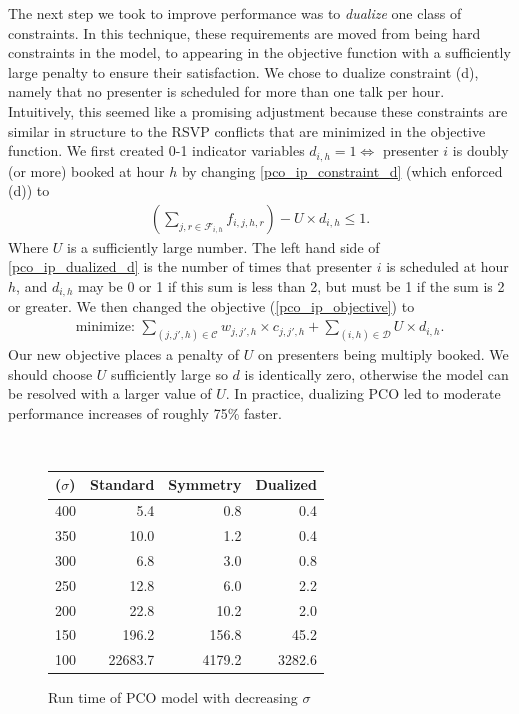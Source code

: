 \documentclass{svjour3}                     %
\begin{document}
The next step we took to improve performance was to \emph{dualize} one class of constraints.
In this technique, these requirements are moved from being hard constraints in the model, to appearing in the objective function with a sufficiently large penalty to ensure their satisfaction.
We chose to dualize constraint (d), namely that no presenter is scheduled for more than one talk per hour. 
Intuitively, this seemed like a promising adjustment because these constraints are similar in structure to the RSVP conflicts that are minimized in the objective function.
We first created 0-1 indicator variables $d_{i,h} = 1 \iff $ presenter $i$ is doubly (or more) booked at hour $h$ by changing \ref{pco_ip_constraint_d} (which enforced (d)) to
\begin{gather}
	\left( \sum_{j,r \in \mathcal F_{i,h}} f_{i,j,h,r} \right) - U \times d_{i,h} \le 1. \label{pco_ip_dualized_d}
\end{gather}
Where $U$ is a sufficiently large number.
The left hand side of \ref{pco_ip_dualized_d} is the number of times that presenter $i$ is scheduled at hour $h$, and $d_{i,h}$ may be 0 or 1 if this sum is less than 2, but must be 1 if the sum is 2 or greater. 
We then changed the objective (\ref{pco_ip_objective}) to 
\begin{gather}
	\text{minimize: } \sum_{(j,j',h) \in \mathcal C} w_{j,j',h} \times c_{j,j',h} + \sum_{(i,h) \in \mathcal D} U \times d_{i,h}.
\end{gather}
Our new objective places a penalty of $U$ on presenters being multiply booked.
We should choose $U$ sufficiently large so $d$ is identically zero, otherwise the model can be resolved with a larger value of $U$. 
In practice, dualizing PCO led to moderate performance increases of roughly 75\% faster.

\begin{figure}[h!]
	\caption{Run time of PCO model with decreasing $\sigma$}
	\centering
	 \\
	\begin{tabular}{| l | r | r | r |}
		\hline
		 ($\sigma$) & Standard & Symmetry & Dualized \\ \hline
		 400 & 5.4 & 0.8 & 0.4 \\
		 350 & 10.0 & 1.2 & 0.4 \\
		 300 & 6.8 & 3.0 & 0.8\\
		 250 &12.8 &6.0 &2.2 \\
		 200 & 22.8 & 10.2 &2.0\\
		 150 & 196.2 & 156.8 & 45.2 \\
		 100 & 22683.7 & 4179.2 &3282.6 \\
		\hline
	\end{tabular}	
\end{figure}
\end{document}

